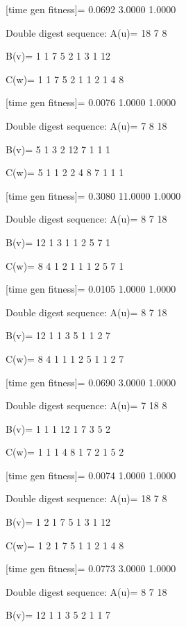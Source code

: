 [time gen fitness]=
    0.0692    3.0000    1.0000

Double digest sequence:
A(u)=
    18     7     8

B(v)=
     1     1     7     5     2     1     3     1    12

C(w)=
     1     1     7     5     2     1     1     2     1     4     8

[time gen fitness]=
    0.0076    1.0000    1.0000

Double digest sequence:
A(u)=
     7     8    18

B(v)=
     5     1     3     2    12     7     1     1     1

C(w)=
     5     1     1     2     2     4     8     7     1     1     1

[time gen fitness]=
    0.3080   11.0000    1.0000

Double digest sequence:
A(u)=
     8     7    18

B(v)=
    12     1     3     1     1     2     5     7     1

C(w)=
     8     4     1     2     1     1     1     2     5     7     1

[time gen fitness]=
    0.0105    1.0000    1.0000

Double digest sequence:
A(u)=
     8     7    18

B(v)=
    12     1     1     3     5     1     1     2     7

C(w)=
     8     4     1     1     1     2     5     1     1     2     7

[time gen fitness]=
    0.0690    3.0000    1.0000

Double digest sequence:
A(u)=
     7    18     8

B(v)=
     1     1     1    12     1     7     3     5     2

C(w)=
     1     1     1     4     8     1     7     2     1     5     2

[time gen fitness]=
    0.0074    1.0000    1.0000

Double digest sequence:
A(u)=
    18     7     8

B(v)=
     1     2     1     7     5     1     3     1    12

C(w)=
     1     2     1     7     5     1     1     2     1     4     8

[time gen fitness]=
    0.0773    3.0000    1.0000

Double digest sequence:
A(u)=
     8     7    18

B(v)=
    12     1     1     3     5     2     1     1     7


